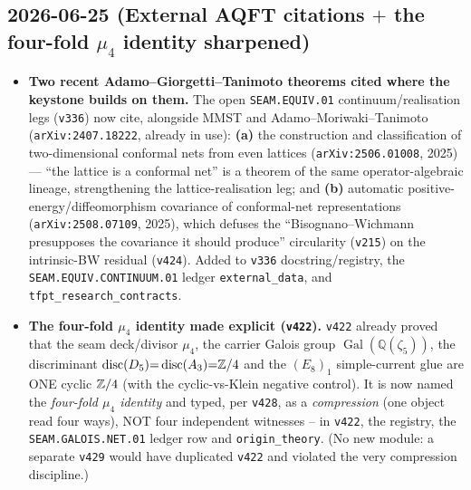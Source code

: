 \documentclass[11pt]{article}
\providecommand{\vref}[1]{\texttt{#1}}
\begin{document}
\subsection*{2026-06-25 (External AQFT citations $+$ the four-fold $\mu_4$ identity sharpened)}
\begin{itemize}
\item \textbf{Two recent Adamo--Giorgetti--Tanimoto theorems cited where the keystone builds on them.}
The open \texttt{SEAM.EQUIV.01} continuum/realisation legs (\vref{v336}) now cite, alongside MMST and
Adamo--Moriwaki--Tanimoto (\texttt{arXiv:2407.18222}, already in use): \textbf{(a)} the construction and
classification of two-dimensional conformal nets from even lattices (\texttt{arXiv:2506.01008}, 2025) ---
``the lattice is a conformal net'' is a theorem of the same operator-algebraic lineage, strengthening the
lattice-realisation leg; and \textbf{(b)} automatic positive-energy/diffeomorphism covariance of conformal-net
representations (\texttt{arXiv:2508.07109}, 2025), which defuses the ``Bisognano--Wichmann presupposes the
covariance it should produce'' circularity (\vref{v215}) on the intrinsic-BW residual (\vref{v424}). Added to
\vref{v336} docstring/registry, the \texttt{SEAM.EQUIV.CONTINUUM.01} ledger \texttt{external\_data}, and
\texttt{tfpt\_research\_contracts}.
\item \textbf{The four-fold $\mu_4$ identity made explicit (\vref{v422}).} \vref{v422} already proved that the
seam deck/divisor $\mu_4$, the carrier Galois group $\operatorname{Gal}(\mathbb Q(\zeta_5))$, the discriminant
$\operatorname{disc}(D_5){=}\operatorname{disc}(A_3){=}\mathbb{Z}/4$ and the $(E_8)_1$ simple-current glue are ONE cyclic
$\mathbb{Z}/4$ (with the cyclic-vs-Klein negative control). It is now named the \emph{four-fold $\mu_4$ identity} and
typed, per \vref{v428}, as a \emph{compression} (one object read four ways), NOT four independent witnesses --
in \vref{v422}, the registry, the \texttt{SEAM.GALOIS.NET.01} ledger row and \texttt{origin\_theory}. (No new
module: a separate \texttt{v429} would have duplicated \vref{v422} and violated the very compression discipline.)
\end{itemize}
\end{document}
